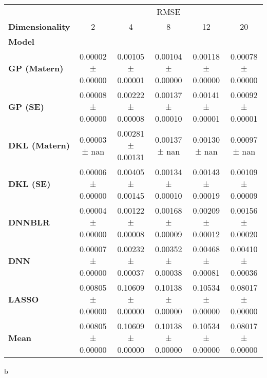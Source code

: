 \begin{tabular}{lccccc}
\toprule
{} & \multicolumn{5}{c}{RMSE} \\
\textbf{Dimensionality} &                 2  &                 4  &                 8  &                 12 &                 20 \\
\textbf{Model       } &                    &                    &                    &                    &                    \\
\midrule
\textbf{GP (Matern) } &  0.00002 ± 0.00000 &  0.00105 ± 0.00001 &  0.00104 ± 0.00000 &  0.00118 ± 0.00000 &  0.00078 ± 0.00000 \\
\textbf{GP (SE)     } &  0.00008 ± 0.00000 &  0.00222 ± 0.00008 &  0.00137 ± 0.00010 &  0.00141 ± 0.00001 &  0.00092 ± 0.00001 \\
\textbf{DKL (Matern)} &      0.00003 ± nan &  0.00281 ± 0.00131 &      0.00137 ± nan &      0.00130 ± nan &      0.00097 ± nan \\
\textbf{DKL (SE)    } &  0.00006 ± 0.00000 &  0.00405 ± 0.00145 &  0.00134 ± 0.00010 &  0.00143 ± 0.00019 &  0.00109 ± 0.00009 \\
\textbf{DNNBLR      } &  0.00004 ± 0.00000 &  0.00122 ± 0.00008 &  0.00168 ± 0.00009 &  0.00209 ± 0.00012 &  0.00156 ± 0.00020 \\
\textbf{DNN         } &  0.00007 ± 0.00000 &  0.00232 ± 0.00037 &  0.00352 ± 0.00038 &  0.00468 ± 0.00081 &  0.00410 ± 0.00036 \\
\textbf{LASSO       } &  0.00805 ± 0.00000 &  0.10609 ± 0.00000 &  0.10138 ± 0.00000 &  0.10534 ± 0.00000 &  0.08017 ± 0.00000 \\
\textbf{Mean        } &  0.00805 ± 0.00000 &  0.10609 ± 0.00000 &  0.10138 ± 0.00000 &  0.10534 ± 0.00000 &  0.08017 ± 0.00000 \\
\bottomrule
\end{tabular}b

